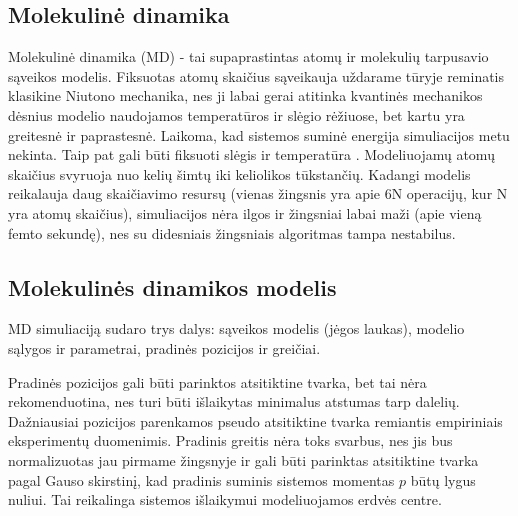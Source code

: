 \subsection{Molekulinė dinamika}
\label{sec:molecular_dynamics}


Molekulinė dinamika (MD) - tai supaprastintas atomų ir molekulių tarpusavio sąveikos modelis.
Fiksuotas atomų skaičius sąveikauja uždarame tūryje reminatis klasikine Niutono mechanika,
nes ji labai gerai atitinka kvantinės mechanikos dėsnius modelio naudojamos temperatūros ir slėgio rėžiuose,
bet kartu yra greitesnė ir paprastesnė.
Laikoma, kad sistemos suminė energija simuliacijos metu nekinta.
Taip pat gali būti fiksuoti slėgis ir temperatūra \cite{hitch}.
Modeliuojamų atomų skaičius svyruoja nuo kelių šimtų iki keliolikos tūkstančių.
Kadangi modelis reikalauja daug skaičiavimo resursų (vienas žingsnis yra apie 6N operacijų, kur N yra atomų skaičius),
simuliacijos nėra ilgos ir žingsniai labai maži (apie vieną femto sekundę), nes su didesniais žingsniais algoritmas tampa nestabilus.


\subsection{Molekulinės dinamikos modelis}
\label{sec:molecular_dynamics_model}


MD simuliaciją sudaro trys dalys: sąveikos modelis (jėgos laukas), modelio sąlygos ir parametrai, pradinės pozicijos ir greičiai.

Pradinės pozicijos gali būti parinktos atsitiktine tvarka, bet tai nėra rekomenduotina, nes turi būti išlaikytas minimalus atstumas tarp dalelių.
Dažniausiai pozicijos parenkamos pseudo atsitiktine tvarka remiantis empiriniais eksperimentų duomenimis.
Pradinis greitis nėra toks svarbus, nes jis bus normalizuotas jau pirmame žingsnyje ir gali būti parinktas atsitiktine tvarka pagal Gauso skirstinį,
kad pradinis suminis sistemos momentas \(p\) būtų lygus nuliui.
Tai reikalinga sistemos išlaikymui modeliuojamos erdvės centre.


